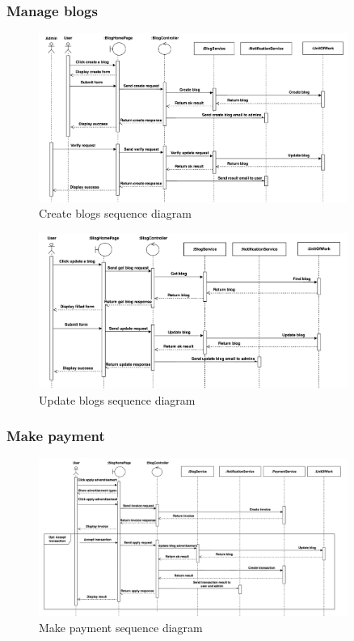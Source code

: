 \subsubsection{Manage blogs}

\begin{figure}[H]
  \centering
  \includegraphics[width=0.9\textwidth]{Figures/manage_blog_seq.png}
  \caption{Create blogs sequence diagram}
  \label{fig:manage-blog-seq}
\end{figure}

\begin{figure}[H]
  \centering
  \includegraphics[width=0.9\textwidth]{Figures/update_blog_seq.png}
  \caption{Update blogs sequence diagram}
  \label{fig:update-blog-seq}
\end{figure}
\clearpage
\subsubsection{Make payment}

\begin{figure}[H]
  \centering
  \includegraphics[width=0.9\textwidth]{Figures/payment_seq.png}
  \caption{Make payment sequence diagram}
  \label{fig:make-payment-seq}
\end{figure}


